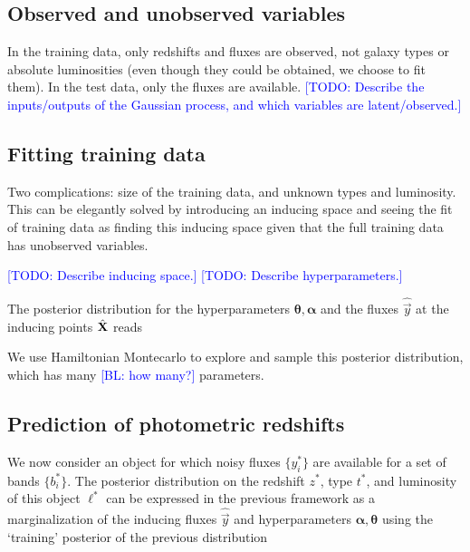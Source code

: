 \documentclass[aps,prd,showpacs,superscriptaddress,groupedaddress]{revtex4}  %
\newcommand{\todo}[1]{\textcolor{blue}{[TODO: #1]}}
\newcommand{\bl}[1]{\textcolor{blue}{[BL: #1]}}
\begin{document}
\subsection{Observed and unobserved variables}

In the training data, only redshifts and fluxes are observed, not galaxy types or absolute luminosities (even though they could be obtained, we choose to fit them). 
In the test data, only the fluxes are available.
\todo{Describe the inputs/outputs of the Gaussian process, and which variables are latent/observed.}

\subsection{Fitting training data}


Two complications: size of the training data, and unknown types and luminosity. 
This can be elegantly solved by introducing an inducing space and seeing the fit of training data as finding this inducing space given that the full training data has unobserved variables.

\todo{Describe inducing space.}
\todo{Describe hyperparameters.}

The posterior distribution for the hyperparameters $\bm{\theta}, \bm{\alpha}$ and the fluxes $\hat{\vec{y}}$ at the inducing points $\hat{\mat{X}}$ reads

We use Hamiltonian Montecarlo to explore and sample this posterior distribution, which has many \bl{how many?} parameters.

\subsection{Prediction of photometric redshifts}

We now consider an object for which noisy fluxes $\{ y_i^* \}$ are available for a set of bands $\{ b_i^* \}$. 
The posterior distribution on the redshift $z^*$, type $t^*$, and luminosity of this object $\ell^*$ can be expressed in the previous framework as a marginalization of the inducing fluxes $\hat{\vec{y}}$ and hyperparameters $\bm{\alpha}, \bm{\theta}$ using the `training' posterior of the previous distribution
 
\end{document}
